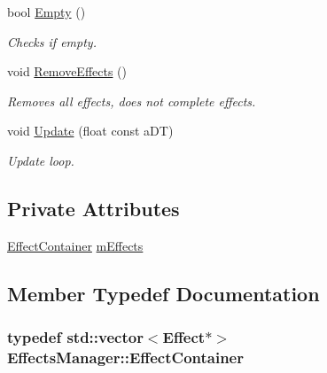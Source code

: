 \begin{DoxyCompactItemize}
bool \hyperlink{classEffectsManager_a3e112de2cfedc049867c72a7e123324c}{Empty} ()
\begin{DoxyCompactList}\small\item\em Checks if empty. \end{DoxyCompactList}\item 
void \hyperlink{classEffectsManager_ab747c4f5bc0d311e638842f3832e65d5}{Remove\+Effects} ()
\begin{DoxyCompactList}\small\item\em Removes all effects, does not complete effects. \end{DoxyCompactList}\item 
void \hyperlink{classEffectsManager_a1a709e1f5ce50ffea1daeb0564147d37}{Update} (float const a\+DT)
\begin{DoxyCompactList}\small\item\em Update loop. \end{DoxyCompactList}\end{DoxyCompactItemize}
\subsection*{Private Attributes}
\begin{DoxyCompactItemize}
\item 
\hyperlink{classEffectsManager_ab5464241f128db0e6c30d77039f4f9ab}{Effect\+Container} \hyperlink{classEffectsManager_ad770a9f398b7261149c3ee7dcfbd08b9}{m\+Effects}
\end{DoxyCompactItemize}


\subsection{Member Typedef Documentation}
\subsubsection[{\texorpdfstring{Effect\+Container}{EffectContainer}}]{\setlength{\rightskip}{0pt plus 5cm}typedef std\+::vector$<${\bf Effect}$\ast$$>$ {\bf Effects\+Manager\+::\+Effect\+Container}}\hypertarget{classEffectsManager_ab5464241f128db0e6c30d77039f4f9ab}{}\label{classEffectsManager_ab5464241f128db0e6c30d77039f4f9ab}
